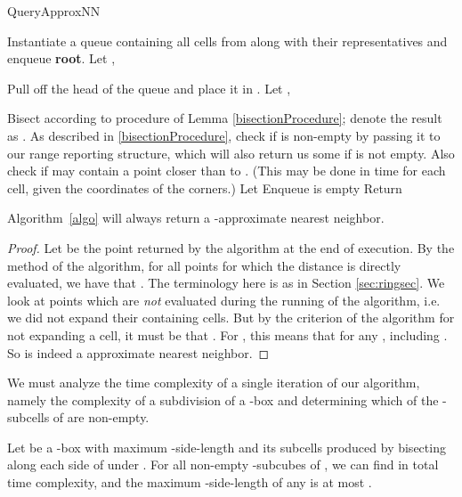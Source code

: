 \documentclass[11pt]{myclass}
\begin{document}
\begin{algorithm}
  \caption{QueryApproxNN}
  \begin{algorithmic}
    \STATE Instantiate a queue  containing all cells from  along with their representatives and 
           enqueue \textbf{root}.
    \STATE Let ,
    
    \REPEAT 
    \STATE Pull off the head of the queue and place it in .
    \IF{}
      \STATE Let , 
             
      \STATE Bisect  according to procedure of Lemma   
             \ref{bisectionProcedure}; denote the result as .
      \FORALL{}
        \STATE As described in \ref{bisectionProcedure}, check if  is non-empty by passing it to our range reporting structure, which will also return us some   if  is not empty. 
        \STATE Also check if   may contain a point closer than  to . (This may be done in  time for each cell, given the coordinates of the corners.) 
          \STATE Let 
          \STATE Enqueue 
        \ENDIF
      \ENDFOR
    \ENDIF
    \UNTIL  is empty
    \STATE Return 
  \end{algorithmic}
  \label{algo}
\end{algorithm}
\begin{lemma}\label{correctness}
Algorithm~\ref{algo} will always return a -approximate nearest neighbor. 
\end{lemma}
\begin{proof}
Let  be the point returned by the algorithm at the end of execution. By the method of the algorithm, for all points  for which the distance is directly evaluated, we have that
. 
The terminology here is as in Section \ref{sec:ringsec}.
We look at points  which are \emph{not} evaluated during the running of the algorithm, 
i.e. we did not expand their containing cells. But by the criterion of the algorithm for not expanding a cell, it must be that . For , this means that  for any , including . So  is indeed a  approximate nearest neighbor.
\end{proof}

We must analyze the time complexity of a single iteration of our algorithm, namely the complexity of a subdivision of a -box  and determining which of the  -subcells of  are non-empty.
\begin{lemma}\label{bisectionProcedure}
Let  be a -box with maximum -side-length  and  its subcells produced by bisecting along each side of  under . For all non-empty -subcubes  of , we can find  in  total time complexity, and the maximum -side-length of any  is at most .
\end{lemma}
\end{document}
